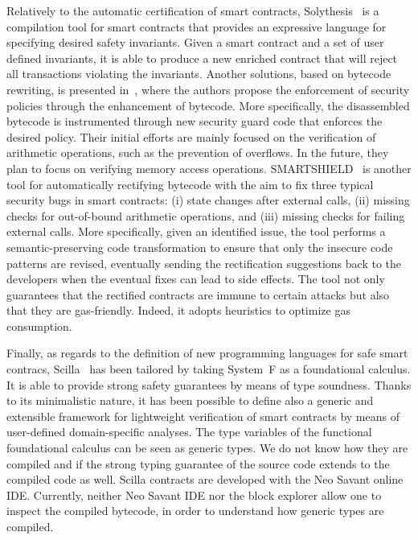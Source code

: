 Relatively to the automatic certification of smart contracts,
Solythesis~\cite{solythesis_solidity_validation} is a compilation tool for smart contracts
that provides an expressive language for specifying desired safety invariants.
Given a smart contract and a set of user defined invariants,
it is able to produce a new enriched contract that will reject all transactions
violating the invariants.
%
Another solutions, based on bytecode rewriting, is presented in~\cite{bytecode_rewriting},
where the authors propose the enforcement of security policies through the enhancement of bytecode.
More specifically, the disassembled bytecode is instrumented through new security guard code
that enforces the desired policy. Their initial efforts are mainly focused on the verification
of arithmetic operations, such as the prevention of overflows. In the future, they plan to focus on
verifying memory access operations.
%
SMARTSHIELD~\cite{smartshield} is another tool for automatically
rectifying bytecode with the aim to fix three typical security bugs in smart contracts:
(i) state changes after external calls, (ii) missing checks for out-of-bound arithmetic operations,
and (iii) missing checks for failing external calls. More specifically, given an identified issue,
the tool performs a semantic-preserving code transformation to ensure that only the insecure code
patterns are revised, eventually sending the rectification suggestions back to the developers
when the eventual fixes can lead to side effects. The tool not only guarantees that the rectified
contracts are immune to certain attacks but also that they are gas-friendly.
Indeed, it adopts heuristics to optimize gas consumption. 


Finally, as regards to the definition of new programming languages for safe smart contracs,
Scilla~\cite{scilla} has been tailored by taking System~F as a foundational calculus.
It is able to provide strong safety guarantees by means of type soundness.
Thanks to its minimalistic nature, it has been possible to define also a generic and extensible
framework for lightweight verification of smart contracts by means of user-defined domain-specific
analyses. The type variables of the functional foundational calculus can be seen as
generic types. We do not know how they are compiled and if the strong typing guarantee of the
source code extends to the compiled code as well. Scilla contracts are developed with
the Neo Savant online IDE. Currently, neither Neo Savant IDE nor the block explorer
allow one to inspect the compiled bytecode, in order to understand how generic types are compiled.
